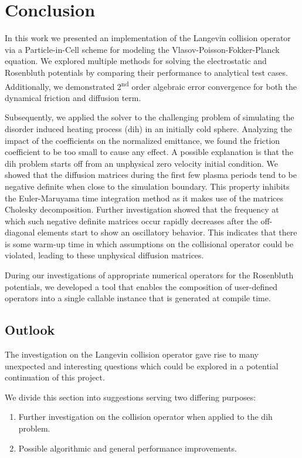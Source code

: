 \chapter{Conclusion}
\label{chapter:conclusion}

In this work we presented an implementation of the Langevin collision operator via a Particle-in-Cell
scheme for modeling the Vlasov-Poisson-Fokker-Planck equation.
We explored multiple methods for solving the electrostatic and Rosenbluth potentials by comparing
their performance to analytical test cases.
Additionally, we demonstrated 2\textsuperscript{nd} order algebraic error convergence for both the dynamical friction
and diffusion term.

Subsequently, we applied the solver to the challenging problem of simulating the disorder induced
heating process (\gls{dih}) in an initially cold sphere.
Analyzing the impact of the coefficients on the normalized emittance, we found the friction
coefficient to be too small to cause any effect.
A possible explanation is that the \gls{dih} problem starts off from
an unphysical zero velocity initial condition.
We showed that the diffusion matrices during the first few plasma periods tend to be negative
definite when close to the simulation boundary. This property inhibits the Euler-Maruyama time
integration method as it makes use of the matrices Cholesky decomposition.
Further investigation showed that the frequency at which such negative definite matrices occur rapidly
decreases after the off-diagonal elements start to show an oscillatory behavior.
This indicates that there is some warm-up time in which assumptions on the collisional operator could
be violated, leading to these unphysical diffusion matrices.

During our investigations of appropriate numerical operators for the Rosenbluth potentials,
we developed a tool that enables the composition of user-defined operators into a single
callable instance that is generated at compile time.
\newpage
\section{Outlook}

The investigation on the Langevin collision operator gave rise to many unexpected and interesting questions which
could be explored in a potential continuation of this project.

We divide this section into suggestions serving two differing purposes:

\begin{enumerate}
    \item Further investigation on the collision operator when applied to the \gls{dih} problem.
    \item Possible algorithmic and general performance improvements.
\end{enumerate}

